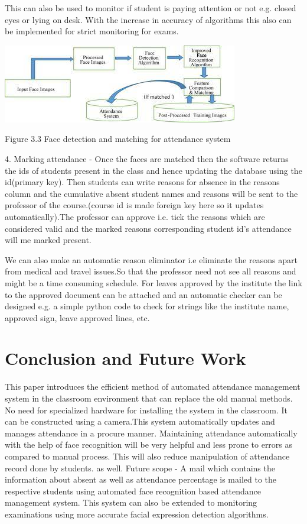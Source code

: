 \documentclass[10pt,twocolumn,letterpaper]{article}
\begin{document}
This can also be used to monitor if student is paying attention or not e.g. closed eyes or lying on desk. With the increase in accuracy of algorithms this also can be implemented for strict monitoring for exams.

\begin{center}
\includegraphics[width=1\linewidth]{images/face_mathcing.jpeg}
\caption{Figure 3.3 Face detection and matching for attendance system }
\end{center}


4. Marking attendance -  Once the faces are matched then the software returns the ids of students present in the class and hence updating the database using the id(primary key). Then students can write reasons for absence in the reasons column and the cumulative absent student names and reasons will be sent to the professor of the course.(course id is made foreign key here so it updates automatically).The professor can approve i.e. tick the reasons which are considered valid and the marked reasons corresponding student id's attendance will me marked present.

We can also make an automatic reason eliminator i.e eliminate the reasons apart from medical and travel issues.So that the professor
need not see all reasons and might be a time consuming schedule. For leaves approved by the institute the link to the approved document can be attached and an automatic checker can be designed e.g. a simple python code to check for strings like the institute name, approved sign, leave approved lines, etc.


\section{Conclusion and Future Work}

This paper introduces the efficient method of automated attendance management system in the classroom
environment that can replace the old manual methods. No need for specialized hardware for
installing the system in the classroom. It can be
constructed using a camera.This system automatically updates and manages attendance in a procure manner. Maintaining attendance automatically with the help of face recognition will be very helpful and less prone to errors as compared to manual process. This will also reduce manipulation of attendance record done by students.
as well. 
Future scope - A mail which contains the information about absent as well as attendance percentage is mailed to the respective students using automated face recognition based attendance management system. This system can also be extended to monitoring examinations using more accurate facial expression detection algorithms.


{\small


}
\end{document}
